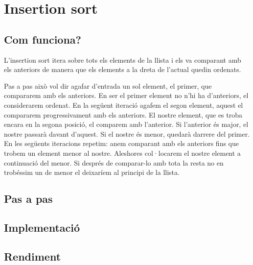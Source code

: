 \chapter{Insertion sort}

\section{Com funciona?}
L'insertion sort itera sobre tots els elements de la llista i els va comparant amb els anteriors de manera que els elements a la dreta de l'actual quedin ordenats.

Pas a pas això vol dir agafar d'entrada un sol element, el primer, que compararem amb els anteriors. En ser el primer element no n'hi ha d'anteriors, el considerarem ordenat.
En la següent iteració agafem el segon element, aquest el compararem progressivament amb els anteriors. El nostre element, que es troba encara en la segona posició, el comparem amb l'anterior. Si l'anterior és major, el nostre passarà davant d'aquest. Si el nostre és menor, quedarà darrere del primer.
En les següents iteracions repetim: anem comparant amb els anteriors fins que trobem un element menor al nostre. Aleshores col·locarem el nostre element a continuació del menor. Si després de comparar-lo amb tota la resta no en trobéssim un de menor el deixaríem al principi de la llista.

\section{Pas a pas}

\section{Implementació}


\begin{minipage}{\textwidth}
	\section{Rendiment}
	\noindent
	\makebox[\textwidth][c]{
		
	}
	\vspace*{1em}
	\begin{center}
		
	\end{center}
\end{minipage}
